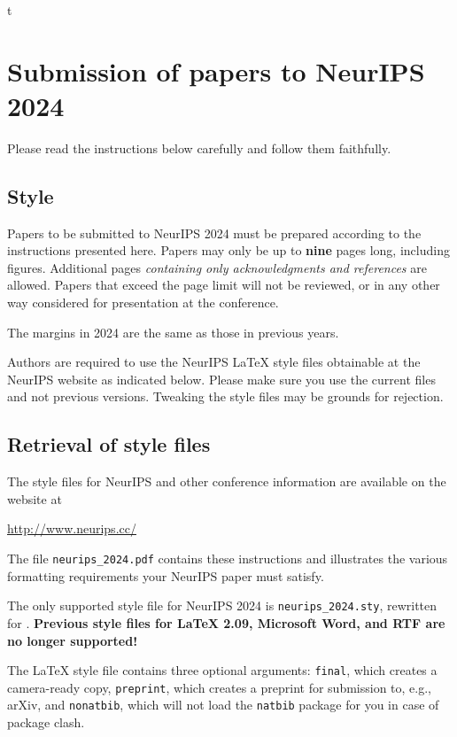 \documentclass{article}
\begin{document}
t





\section{Submission of papers to NeurIPS 2024}


Please read the instructions below carefully and follow them faithfully.


\subsection{Style}


Papers to be submitted to NeurIPS 2024 must be prepared according to the
instructions presented here. Papers may only be up to {\bf nine} pages long,
including figures. Additional pages \emph{containing only acknowledgments and
references} are allowed. Papers that exceed the page limit will not be
reviewed, or in any other way considered for presentation at the conference.


The margins in 2024 are the same as those in previous years.


Authors are required to use the NeurIPS \LaTeX{} style files obtainable at the
NeurIPS website as indicated below. Please make sure you use the current files
and not previous versions. Tweaking the style files may be grounds for
rejection.


\subsection{Retrieval of style files}


The style files for NeurIPS and other conference information are available on
the website at
\begin{center}
  \url{http://www.neurips.cc/}
\end{center}
The file \verb+neurips_2024.pdf+ contains these instructions and illustrates the
various formatting requirements your NeurIPS paper must satisfy.


The only supported style file for NeurIPS 2024 is \verb+neurips_2024.sty+,
rewritten for \LaTeXe{}.  \textbf{Previous style files for \LaTeX{} 2.09,
  Microsoft Word, and RTF are no longer supported!}


The \LaTeX{} style file contains three optional arguments: \verb+final+, which
creates a camera-ready copy, \verb+preprint+, which creates a preprint for
submission to, e.g., arXiv, and \verb+nonatbib+, which will not load the
\verb+natbib+ package for you in case of package clash.
\end{document}
